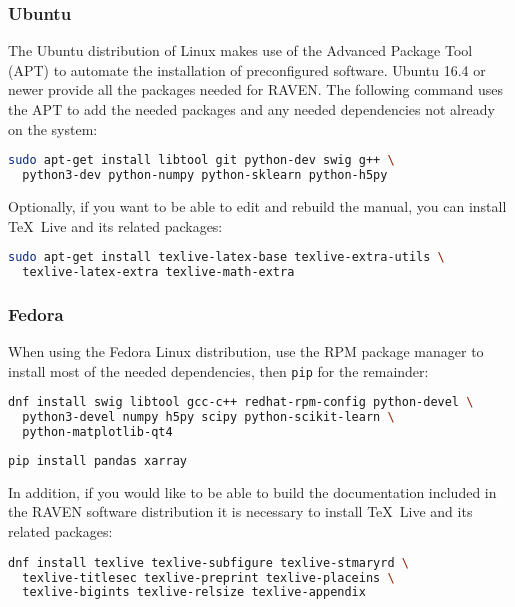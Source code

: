 \subsubsection{Ubuntu}

The Ubuntu distribution of Linux makes use of the Advanced Package
Tool (APT) to automate the installation of preconfigured software.
Ubuntu 16.4 or newer provide all the packages needed for RAVEN.  The
following command uses the APT to add the needed packages and any
needed dependencies not already on the system:

\begin{lstlisting}[language=bash]
sudo apt-get install libtool git python-dev swig g++ \
  python3-dev python-numpy python-sklearn python-h5py
\end{lstlisting}

Optionally, if you want to be able to edit and rebuild the manual, you can
install \TeX~Live and its related packages:
\begin{lstlisting}[language=bash]
sudo apt-get install texlive-latex-base texlive-extra-utils \
  texlive-latex-extra texlive-math-extra
\end{lstlisting}

\goToRavenInstallation

\subsubsection{Fedora}

When using the Fedora Linux distribution, use the RPM package manager to
install most of the needed dependencies, then \texttt{pip} for the remainder:

\begin{lstlisting}[language=bash]
dnf install swig libtool gcc-c++ redhat-rpm-config python-devel \
  python3-devel numpy h5py scipy python-scikit-learn \
  python-matplotlib-qt4
\end{lstlisting}
\begin{lstlisting}[language=bash]
pip install pandas xarray
\end{lstlisting}

In addition, if you would like to be able to build the documentation
included in the RAVEN software distribution it is necessary to install
\TeX~Live and its related packages:
\begin{lstlisting}[language=bash]
dnf install texlive texlive-subfigure texlive-stmaryrd \
  texlive-titlesec texlive-preprint texlive-placeins \
  texlive-bigints texlive-relsize texlive-appendix
\end{lstlisting}

